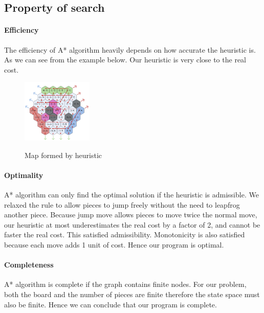 \documentclass[11pt,a4paper]{article}
\begin{document}
    \subsection{Property of search}
        \paragraph{Efficiency} The efficiency of A* algorithm heavily depends on how accurate the heuristic is. As we can see from the example below. Our heuristic is very close to the real cost.    
        \begin{figure}
            \vspace{-35pt}
                \begin{center}
                    \includegraphics[width=0.3\textwidth]{heuristic.png}
                    \label{fig:heurstics}
                \end{center}
            \caption{Map formed by heuristic}
            \vspace{-100pt}
        \end{figure}
        \vspace{-40pt}
        \paragraph{Optimality} A* algorithm can only find the optimal solution if the heuristic is admissible. We relaxed the rule to allow pieces to jump freely without the need to leapfrog another piece. Because jump move allows pieces to move twice the normal move, our heuristic at most underestimates the real cost by a factor of 2, and cannot be faster the real cost. This satisfied admissibility. Monotonicity is also satisfied because each move adds 1 unit of cost. Hence our program is optimal.
        \vspace{-10pt}
        \paragraph{Completeness} A* algorithm is complete if the graph contains finite nodes. For our problem, both the board and the number of pieces are finite therefore the state space must also be finite. Hence we can conclude that our program is complete.
\end{document}
